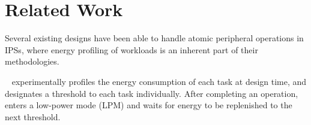 \section{Related Work} \label{sec:c5_review}




Several existing designs have been able to handle atomic peripheral operations in IPSs, where energy profiling of workloads is an inherent part of their methodologies.

\debs{}~\cite{gomez2016dynamic} experimentally profiles the energy consumption of each task at design time, and designates a threshold to each task individually.
After completing an operation, \debs{} enters a low-power mode (LPM) and waits for energy to be replenished to the next threshold. 

